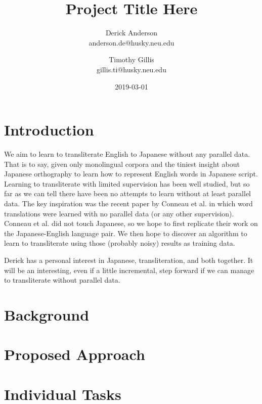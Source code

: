 \documentclass{article}
\title{Project Title Here}
\date{2019-03-01}
\author{Derick Anderson \\ anderson.de@husky.neu.edu
  \and Timothy Gillis \\ gillis.ti@husky.neu.edu }
\begin{document}
\maketitle

\section*{Introduction}

We aim to learn to transliterate English to Japanese
without any parallel data.
That is to say,
given only monolingual corpora
and the tiniest insight about Japanese orthography
to learn how to represent English words in Japanese script.
Learning to transliterate with limited supervision has been well studied,
but so far as we can tell
there have been no attempts to learn without at least parallel data.
The key inspiration was the recent paper by
Conneau et al. \cite{Conneau2018WordTW}
in which word translations were learned with no parallel data
(or any other supervision).
Conneau et al. did not touch Japanese,
so we hope to first replicate their work on the Japanese-English language pair.
We then hope to discover an algorithm to learn to transliterate
using those (probably noisy) results as training data.

Derick has a personal interest in Japanese, transliteration, and both together.
It will be an interesting,
even if a little incremental,
step forward if we can manage to transliterate
without parallel data.

\section*{Background}

\section*{Proposed Approach}

\section*{Individual Tasks}

{}

\end{document}
